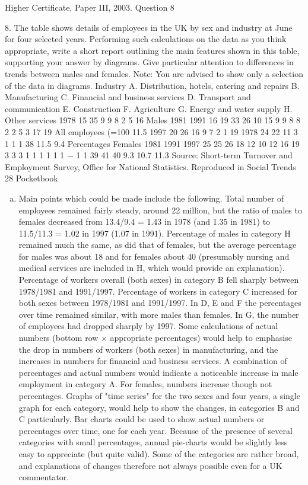 \documentclass[a4paper,12pt]{article}
\begin{document}
Higher Certificate, Paper III, 2003. Question 8

\begin{framed}
8.
The table shows details of employees in the UK by sex and industry at June for four
selected years. Performing such calculations on the data as you think appropriate,
write a short report outlining the main features shown in this table, supporting your
answer by diagrams. Give particular attention to differences in trends between males
and females.
Note: You are advised to show only a selection of the data in diagrams.
Industry
A. Distribution, hotels, catering and repairs
B. Manufacturing
C. Financial and business services
D. Transport and communication
E. Construction
F. Agriculture
G. Energy and water supply
H. Other services 1978
15
35
9
9
8
2
5
16 Males
1981 1991
16
19
33
26
10
15
9
9
8
8
2
2
5
3
17
19
All employees (=100%
11.5
1997
20
26
16
9
7
2
1
19 1978
24
22
11
3
1
1
1
38
11.5 9.4
Percentages
Females
1981 1991 1997
25
25
26
18
12
10
12
16
19
3
3
3
1
1
1
1
1
1
−
1
1
39
41
40
9.3
10.7
11.3
Source: Short-term Turnover and Employment Survey, Office for National Statistics. Reproduced in
Social Trends 28 Pocketbook
\end{framed}
\begin{enumerate}[(a)]
\item Main points which could be made include the following.
Total number of employees remained fairly steady, around 22 million, but the
ratio of males to females decreased from 13.4/9.4 = 1.43 in 1978 (and 1.35 in
1981) to 11.5/11.3 = 1.02 in 1997 (1.07 in 1991).
Percentage of males in category H remained much the same, as did that of
females, but the average percentage for males was about 18 and for females
about 40 (presumably nursing and medical services are included in H, which
would provide an explanation).
Percentage of workers overall (both sexes) in category B fell sharply between
1978/1981 and 1991/1997.
Percentage of workers in category C increased for both sexes between
1978/1981 and 1991/1997.
In D, E and F the percentages over time remained similar, with more males
than females.
In G, the number of employees had dropped sharply by 1997.
Some calculations of actual numbers (bottom row × appropriate percentages) would
help to emphasise the drop in numbers of workers (both sexes) in manufacturing, and
the increases in numbers for financial and business services.
A combination of percentages and actual numbers would indicate a noticeable
increase in male employment in category A. For females, numbers increase though
not percentages.
Graphs of "time series" for the two sexes and four years, a single graph for each
category, would help to show the changes, in categories B and C particularly.
Bar charts could be used to show actual numbers or percentages over time, one for
each year. Because of the presence of several categories with small percentages,
annual pie-charts would be slightly less easy to appreciate (but quite valid).
Some of the categories are rather broad, and explanations of changes therefore not
always possible even for a UK commentator.
\end{enumerate}
\end{document}
